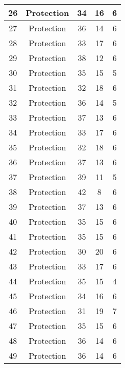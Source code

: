 \documentclass[results.tex]{subfiles}
\begin{document}
\begin{center}
\begin{tabular}{| c || c | c | c | c |}
    \hline
    26 & Protection & 34 & 16 & 6 \\ 
    \hline
    27 & Protection & 36 & 14 & 6 \\ 
    \hline
    28 & Protection & 33 & 17 & 6 \\ 
    \hline
    29 & Protection & 38 & 12 & 6 \\ 
    \hline
    30 & Protection & 35 & 15 & 5 \\ 
    \hline
    31 & Protection & 32 & 18 & 6 \\ 
    \hline
    32 & Protection & 36 & 14 & 5 \\ 
    \hline
    33 & Protection & 37 & 13 & 6 \\ 
    \hline
    34 & Protection & 33 & 17 & 6 \\ 
    \hline
    35 & Protection & 32 & 18 & 6 \\ 
    \hline
    36 & Protection & 37 & 13 & 6 \\ 
    \hline
    37 & Protection & 39 & 11 & 5 \\ 
    \hline
    38 & Protection & 42 & 8 & 6 \\ 
    \hline
    39 & Protection & 37 & 13 & 6 \\ 
    \hline
    40 & Protection & 35 & 15 & 6 \\ 
    \hline
    41 & Protection & 35 & 15 & 6 \\ 
    \hline
    42 & Protection & 30 & 20 & 6 \\ 
    \hline
    43 & Protection & 33 & 17 & 6 \\ 
    \hline
    44 & Protection & 35 & 15 & 4 \\ 
    \hline
    45 & Protection & 34 & 16 & 6 \\ 
    \hline
    46 & Protection & 31 & 19 & 7 \\ 
    \hline
    47 & Protection & 35 & 15 & 6 \\ 
    \hline
    48 & Protection & 36 & 14 & 6 \\ 
    \hline
    49 & Protection & 36 & 14 & 6 \\ 
    \hline   \end{tabular}
\end{center}
\end{document}
